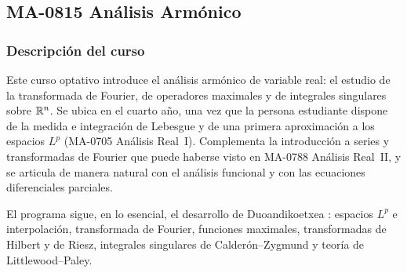 \newpage
\subsection*{MA-0815 Análisis Armónico}

\hypertarget{MA0815}{}
\begin{refsection}
\begin{table}[H]
\end{table}

\subsubsection*{Descripción del curso}

Este curso optativo introduce el análisis armónico de variable real: el estudio de la transformada de Fourier, de operadores maximales y de integrales singulares sobre $\mathbb{R}^n$. Se ubica en el cuarto año, una vez que la persona estudiante dispone de la medida e integración de Lebesgue y de una primera aproximación a los espacios $L^p$ (MA-0705 Análisis Real~I). Complementa la introducción a series y transformadas de Fourier que puede haberse visto en MA-0788 Análisis Real~II, y se articula de manera natural con el análisis funcional y con las ecuaciones diferenciales parciales.

El programa sigue, en lo esencial, el desarrollo de Duoandikoetxea \cite{Duo01}: espacios $L^p$ e interpolación, transformada de Fourier, funciones maximales, transformadas de Hilbert y de Riesz, integrales singulares de Calderón--Zygmund y teoría de Littlewood--Paley.


\end{refsection}

